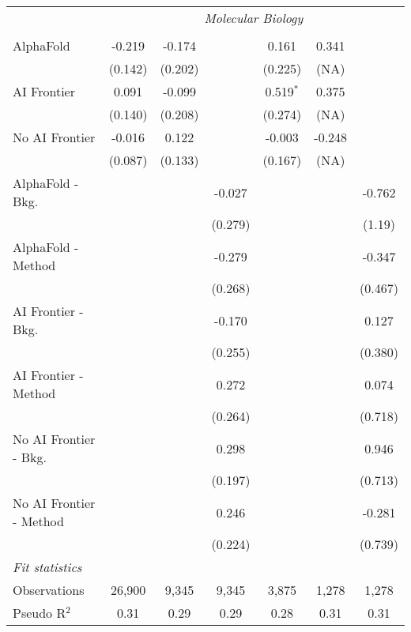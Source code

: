 \begin{tabular}{lcccccc}
 & \multicolumn{6}{c}{\textit{Molecular Biology}} \\ \\
   AlphaFold               & -0.219  & -0.174  &         & 0.161       & 0.341  &   \\   
                           & (0.142) & (0.202) &         & (0.225)     & (NA)   &   \\   
   AI Frontier             & 0.091   & -0.099  &         & 0.519$^{*}$ & 0.375  &   \\   
                           & (0.140) & (0.208) &         & (0.274)     & (NA)   &   \\   
   No AI Frontier          & -0.016  & 0.122   &         & -0.003      & -0.248 &   \\   
                           & (0.087) & (0.133) &         & (0.167)     & (NA)   &   \\   
   AlphaFold - Bkg.        &         &         & -0.027  &             &        & -0.762\\   
                           &         &         & (0.279) &             &        & (1.19)\\   
   AlphaFold - Method      &         &         & -0.279  &             &        & -0.347\\   
                           &         &         & (0.268) &             &        & (0.467)\\   
   AI Frontier - Bkg.      &         &         & -0.170  &             &        & 0.127\\   
                           &         &         & (0.255) &             &        & (0.380)\\   
   AI Frontier - Method    &         &         & 0.272   &             &        & 0.074\\   
                           &         &         & (0.264) &             &        & (0.718)\\   
   No AI Frontier - Bkg.   &         &         & 0.298   &             &        & 0.946\\   
                           &         &         & (0.197) &             &        & (0.713)\\   
   No AI Frontier - Method &         &         & 0.246   &             &        & -0.281\\   
                           &         &         & (0.224) &             &        & (0.739)\\   
   \midrule
   \emph{Fit statistics}\\
   Observations            & 26,900  & 9,345   & 9,345   & 3,875       & 1,278  & 1,278\\  
   Pseudo R$^2$            & 0.31    & 0.29    & 0.29    & 0.28        & 0.31   & 0.31\\  
   

\end{tabular}
